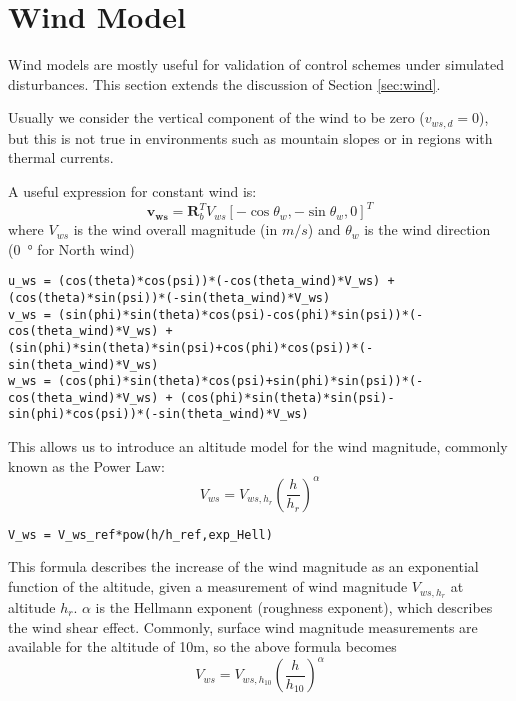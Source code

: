 \section{Wind Model}\label{sec:wind_model}

Wind models are mostly useful for validation of control schemes under simulated disturbances. This section extends the discussion of Section \ref{sec:wind}.

Usually we consider the vertical component of the wind to be zero ($v_{ws,d}=0$), but this is not true in environments such as mountain slopes or in regions with thermal currents.

A useful expression for constant wind is:
\begin{equation}
\bm{v_{ws}} = \bm{R}_b^TV_{ws}[-\cos\theta_w, -\sin\theta_w, 0]^T
\end{equation}
where $V_{ws}$ is the wind overall magnitude (in $m/s$) and $\theta_w$ is the wind direction (\SI{0}{\degree} for North wind)

\begin{lstlisting}[style=C-style]
u_ws = (cos(theta)*cos(psi))*(-cos(theta_wind)*V_ws) + (cos(theta)*sin(psi))*(-sin(theta_wind)*V_ws)
v_ws = (sin(phi)*sin(theta)*cos(psi)-cos(phi)*sin(psi))*(-cos(theta_wind)*V_ws) + (sin(phi)*sin(theta)*sin(psi)+cos(phi)*cos(psi))*(-sin(theta_wind)*V_ws)
w_ws = (cos(phi)*sin(theta)*cos(psi)+sin(phi)*sin(psi))*(-cos(theta_wind)*V_ws) + (cos(phi)*sin(theta)*sin(psi)-sin(phi)*cos(psi))*(-sin(theta_wind)*V_ws)
\end{lstlisting}

This allows us to introduce an altitude model for the wind magnitude, commonly known as the Power Law:
\begin{equation}
V_{ws} = V_{ws,h_r} \left(\frac{h}{h_r}\right)^\alpha
\end{equation}

\begin{lstlisting}[style=C-style]
V_ws = V_ws_ref*pow(h/h_ref,exp_Hell)
\end{lstlisting}

This formula describes the increase of the wind magnitude as an exponential function of the altitude, given a measurement of wind magnitude $V_{ws,h_r}$ at altitude $h_r$. $\alpha$ is the Hellmann exponent (roughness exponent), which describes the wind shear effect. Commonly, surface wind magnitude measurements are available for the altitude of 10m, so the above formula becomes
\begin{equation} \label{eq:staticWind10}
V_{ws} = V_{ws,h_{10}} \left(\frac{h}{h_{10}}\right)^\alpha
\end{equation}

